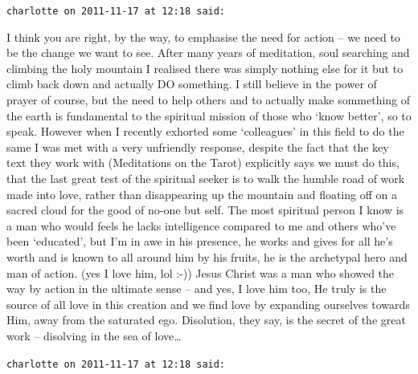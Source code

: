 \begin{footnotesize}\begin{sffamily}



\texttt{charlotte on 2011-11-17 at 12:18 said: }

I think you are right, by the way, to emphasise the need for action – we need to be the change we want to see. After many years of meditation, soul searching and climbing the holy mountain I realised there was simply nothing else for it but to climb back down and actually DO something. I still believe in the power of prayer of course, but the need to help others and to actually make sommething of the earth is fundamental to the spiritual mission of those who `know better', so to speak. However when I recently exhorted some `colleagues' in this field to do the same I was met with a very unfriendly response, despite the fact that the key text they work with (Meditations on the Tarot) explicitly says we must do this, that the last great test of the spiritual seeker is to walk the humble road of work made into love, rather than disappearing up the mountain and floating off on a sacred cloud for the good of no-one but self. The most spiritual person I know is a man who would feels he lacks intelligence compared to me and others who've been `educated', but I'm in awe in his presence, he works and gives for all he's worth and is known to all around him by his fruits, he is the archetypal hero and man of action. (yes I love him, lol :-)) Jesus Christ was a man who showed the way by action in the ultimate sense – and yes, I love him too, He truly is the source of all love in this creation and we find love by expanding ourselves towards Him, away from the saturated ego. Disolution, they say, is the secret of the great work – disolving in the sea of love…


\hfill

\texttt{charlotte on 2011-11-17 at 12:18 said: }


\end{sffamily}
\end{footnotesize}
